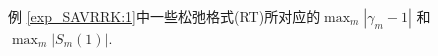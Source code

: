 \documentclass[aspectratio=169]{beamer}
\numberwithin{theorem}{section} %
\begin{document}
\begin{frame}%

\begin{figure}[H]
	\begin{center}
	\caption{例 \ref{exp_SAVRRK:1}中一些松弛格式(RT)所对应的$\max_m\left|\gamma_m-1\right|$ 和 $\max_m\left|S_m(1)\right|$.}
	\label{fig_SAVRRK:1}
	\end{center}
	\end{figure}
\end{frame}
\end{document}
